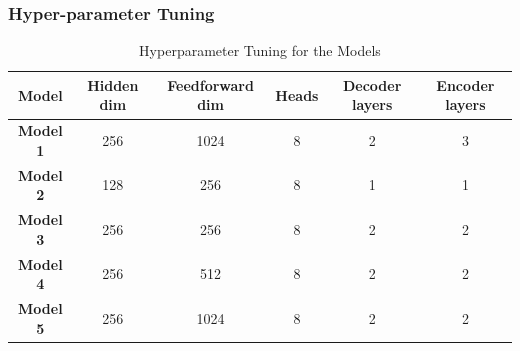 \documentclass{article}
\begin{document}
\subsubsection{Hyper-parameter Tuning}
\begin{table}[ht]
\caption{Hyperparameter Tuning for the Models}
\begin{center}
\begin{tabular}{cccccc} \toprule
   \textbf{Model} & \textbf{Hidden dim}& \textbf{Feedforward dim}
   & \textbf{Heads}& \textbf{Decoder layers}& \textbf{Encoder layers}\\ \midrule
    
    \textbf{Model 1}  & 256  & 1024 & 8 & 2 & 3\\
    \textbf{Model 2}   & 128  & 256 & 8 & 1 & 1\\
    \textbf{Model 3}   & 256  & 256 & 8 & 2 & 2 \\
    \textbf{Model 4}   & 256  & 512 & 8 & 2 & 2 \\
    \textbf{Model 5}  & 256  & 1024 & 8 & 2 & 2 \\\bottomrule
\end{tabular}
\end{center}
\end{table}
\end{document}
